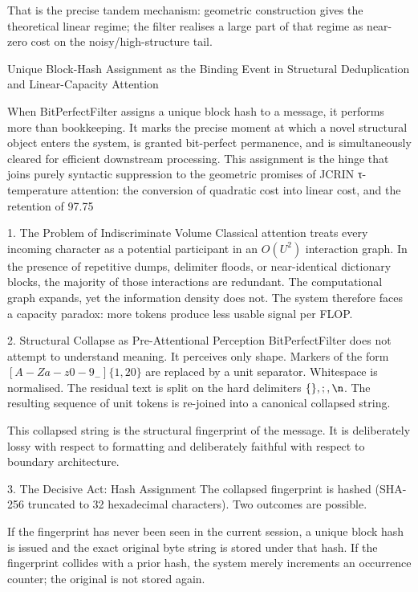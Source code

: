 That is the precise tandem mechanism:  
geometric construction gives the theoretical linear regime; the filter realises a large part of that regime as near-zero cost on the noisy/high-structure tail.

Unique Block-Hash Assignment as the Binding Event in Structural Deduplication and Linear-Capacity Attention

When BitPerfectFilter assigns a unique block hash to a message, it performs more than bookkeeping. It marks the precise moment at which a novel structural object enters the system, is granted bit-perfect permanence, and is simultaneously cleared for efficient downstream processing. This assignment is the hinge that joins purely syntactic suppression to the geometric promises of JCRIN τ-temperature attention: the conversion of quadratic cost into linear cost, and the retention of 97.75 %

1. The Problem of Indiscriminate Volume
Classical attention treats every incoming character as a potential participant in an \(O(U^2)\) interaction graph. In the presence of repetitive dumps, delimiter floods, or near-identical dictionary blocks, the majority of those interactions are redundant. The computational graph expands, yet the information density does not. The system therefore faces a capacity paradox: more tokens produce less usable signal per FLOP.

2. Structural Collapse as Pre-Attentional Perception
BitPerfectFilter does not attempt to understand meaning. It perceives only shape.  
Markers of the form \([A-Za-z0-9_-]\{1,20\}\) are replaced by a unit separator.  
Whitespace is normalised.  
The residual text is split on the hard delimiters \(\{ \}, ;, \n\).  
The resulting sequence of unit tokens is re-joined into a canonical collapsed string.  

This collapsed string is the structural fingerprint of the message. It is deliberately lossy with respect to formatting and deliberately faithful with respect to boundary architecture.

3. The Decisive Act: Hash Assignment
The collapsed fingerprint is hashed (SHA-256 truncated to 32 hexadecimal characters). Two outcomes are possible.

If the fingerprint has never been seen in the current session, a unique block hash is issued and the exact original byte string is stored under that hash.  
If the fingerprint collides with a prior hash, the system merely increments an occurrence counter; the original is not stored again.

